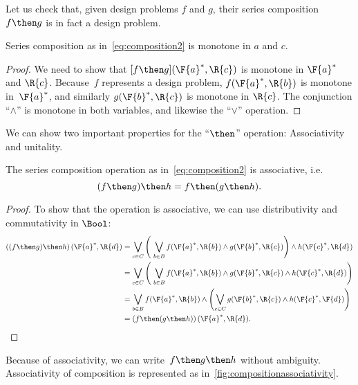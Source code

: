 Let us check that, given design problems $f$ and $g$, their series composition $f\then g$ is in fact a design problem.
\begin{lemma}
    Series composition as in~\cref{eq:composition2} is monotone in $a$ and $c$.
\end{lemma}
\begin{proof}
 We need to show that $[f\then g](\F{a}^*,\R{c})$ is monotone in $\F{a}^*$ and $\R{c}$. Because~$f$ represents a design problem, $f(\F{a}^*,\R{b})$ is monotone in~$\F{a}^*$, and similarly $g(\F{b}^*,\R{c})$  is monotone in $\R{c}$. The conjunction ``$\wedge$'' is monotone in both variables, and likewise the ``$\vee$'' operation.
 \end{proof}

\noindent We can show two important properties for the ``$\then$'' operation: Associativity and unitality.

\begin{lemma}
    The series composition operation as in~\cref{eq:composition2} is associative, i.e. 
    \begin{equation}
        (f\then g)\then h = f\then (g\then h).
    \end{equation}
\end{lemma}

\begin{proof}
To show that the operation is associative, we can use distributivity and commutativity in $\Bool$:
%
\begin{equation}
\begin{aligned}
\left((f\then g) \then h\right) (\F{a}^*,\R{d})
&= \bigvee_{c \in C} \left (\ \bigvee_{b\in B } f(\F{a}^*,\R{b}) \wedge g(\F{b}^*,\R{c}) \right )  \wedge  h (\F{c}^*, \R{d}) \\
&= \bigvee_{c \in C} \left (\ \bigvee_{b\in B } f(\F{a}^*,\R{b})
\wedge g(\F{b}^*,\R{c}) \wedge h (\F{c}^*, \R{d})
    \right ) \\
&= \bigvee_{b \in B } f(\F{a}^*,\R{b}) \wedge \left ( \bigvee_{c\in C} g(\F{b}^*,\R{c}) \wedge h (\F{c}^*, \F{d}) \right ) \\
&= \left(f \then (g \then h )\right) (\F{a}^*, \R{d}).
\end{aligned}
\end{equation}
%
\end{proof}

Because of associativity, we can write~$f\then g\then h$ without ambiguity.
Associativity of composition is represented as in~\cref{fig:compositionassociativity}.

